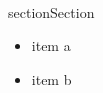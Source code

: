 \\section{Section}\label{section}

\begin{itemize}
\tightlist
\item
  item a
\item
  item b
\end{itemize}
